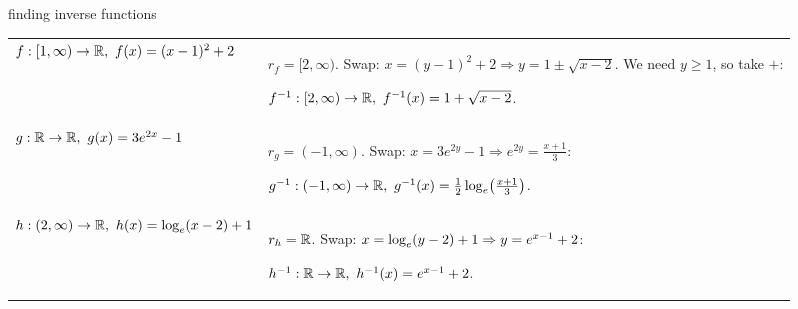 \begin{example}{finding inverse functions \byhand}
\begin{tabularx}{\linewidth}{@{}p{4.4cm}L@{}}
$f:[1,\infty)\to\mathbb{R},\ f(x)=(x-1)^2+2$ & $r_f=[2,\infty)$. Swap: $x=(y-1)^2+2\Rightarrow y=1\pm\sqrt{x-2}$. We need $y\ge1$, so take $+$:\par $f^{-1}:[2,\infty)\to\R,\ f^{-1}(x)=1+\sqrt{x-2}$. \\[3pt]
$g:\mathbb{R}\to\mathbb{R},\ g(x)=3e^{2x}-1$ & $r_g=(-1,\infty)$. Swap: $x=3e^{2y}-1\Rightarrow e^{2y}=\frac{x+1}{3}$:\par $g^{-1}:(-1,\infty)\to\R,\ g^{-1}(x)=\frac12\loge\!\left(\frac{x+1}{3}\right)$. \\[3pt]
$h:(2,\infty)\to\mathbb{R},\ h(x)=\log_e(x-2)+1$ & $r_h=\mathbb{R}$. Swap: $x=\log_e(y-2)+1\Rightarrow y=e^{x-1}+2$:\par $h^{-1}:\R\to\R,\ h^{-1}(x)=e^{x-1}+2$. \\
\end{tabularx}
\end{example}

